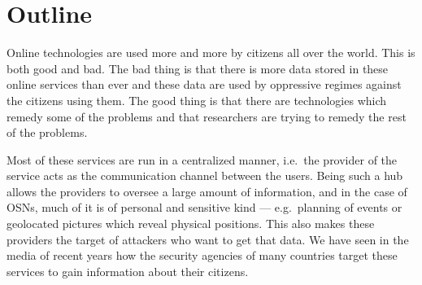 \documentclass[a4paper]{llncs}
\begin{document}
\section{Outline}
\label{Outline}

Online technologies are used more and more by citizens all over the world.
This is both good and bad.
The bad thing is that there is more data stored in these online services than 
ever and these data are used by oppressive regimes against the citizens using 
them.
The good thing is that there are technologies which remedy some of the problems 
and that researchers are trying to remedy the rest of the problems.

Most of these services are run in a centralized manner, i.e.\ the provider of 
the service acts as the communication channel between the users.
Being such a hub allows the providers to oversee a large amount of information, 
and in the case of \acp{OSN}, much of it is of personal and sensitive kind ---  
e.g.\ planning of events or geolocated pictures which reveal physical 
positions.
This also makes these providers the target of attackers who want to get that 
data.
We have seen in the media of recent years how the security agencies of many 
countries target these services to gain information about their citizens.
\end{document}
